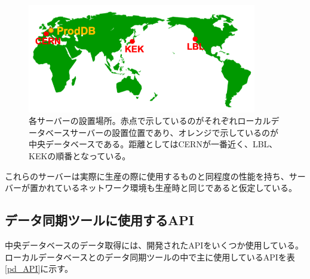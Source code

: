 \begin{figure}[bpt]\centering
\includegraphics[width=10cm]{server_geometry}
\caption[各サーバーの設置場所]{各サーバーの設置場所。赤点で示しているのがそれぞれローカルデータベースサーバーの設置位置であり、オレンジで示しているのが中央データベースである。距離としてはCERNが一番近く、LBL、KEKの順番となっている。}
\label{server_geometry}
\end{figure}

これらのサーバーは実際に生産の際に使用するものと同程度の性能を持ち、サーバーが置かれているネットワーク環境も生産時と同じであると仮定している。

\subsection{データ同期ツールに使用するAPI}
中央データベースのデータ取得には、開発されたAPIをいくつか使用している。
ローカルデータベースとのデータ同期ツールの中で主に使用しているAPIを表\ref{pd_API}に示す。

\begin{table}[tbp]
  \begin{center}
  \caption[データ同期ツールの中で使用する中央データベースの主なAPI一覧]{データ同期ツールの中で使用する中央データベースの主なAPI一覧。データ同期ツールにおいて、中央データベースの情報取得には提供されているいくつかのAPIを用いており代表的なものをいかに示す。このAPIをPythonを用いて実行することで、情報取得や試験結果のアップロードをすることができる。}
  \label{pd_API}
  \end{center}
\end{table}

